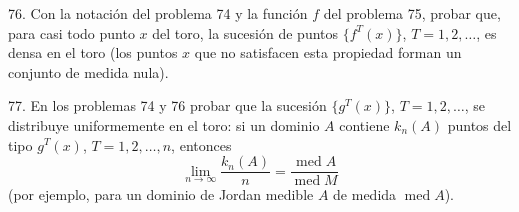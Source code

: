\begin{problem}{76.}
	Con la notaci\'on del problema 74 y la funci\'on $f$ del problema 75, probar que, para casi todo punto $x$ del toro, la sucesi\'on de puntos $\{f^T (x)\}$, $T=1, 2, \dots$, es densa en el toro
	(los puntos $x$ que no satisfacen esta propiedad forman un conjunto de medida nula).
\end{problem}

\begin{problem}{77.}
	En los problemas 74 y 76 probar que la sucesi\'on $\{g^T (x)\}$, $T=1, 2, \dots$, se distribuye uniformemente en el toro: 
	si un dominio $A$ contiene $k_n(A)$ puntos del tipo $ g^T (x) $,  $T=1, 2, \dots,n$, entonces
	\begin{equation*}
	\lim_{n \to \infty} \frac{k_n(A)}{n}=\frac{\operatorname{med} A}{\operatorname{med} M}
	\end{equation*}
	(por ejemplo, para un dominio de Jordan medible $A$ de medida $\operatorname{med} A$).
\end{problem}

\vfill

